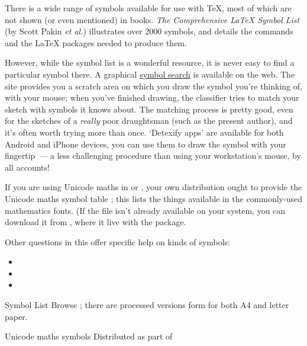 
There is a wide range of symbols available for use with \TeX{}, most
of which are not shown (or even mentioned) in \AllTeX{} books.
\emph{The Comprehensive \LaTeX{} Symbol List} (by Scott Pakin
\emph{et al.}\@) illustrates over 2000 symbols, and details the
commands and the \LaTeX{} packages needed to produce them.

However, while the symbol list is a wonderful resource, it is never
easy to find a particular symbol there.  A graphical %
\href{http://detexify.kirelabs.org/classify.html}{symbol search} is
available on the web.  The site provides you a scratch area on which
you draw the symbol you're thinking of, with your mouse; when you've
finished drawing, the classifier tries to match your sketch with
symbols it knows about.  The matching process is pretty good, even for
the sketches of a \emph{really} poor draughtsman (such as the present
author), and it's often worth trying more than once.  `Detexify apps'
are available for both Android and iPhone devices, you can use them to
draw the symbol with your fingertip~--- a less challenging procedure
than using your workstation's mouse, by all accounts!

If you are using Unicode maths in \xetex{} or \luatex{}, your own
distribution ought to provide the Unicode maths symbol table
; this lists the things available in the
commonly-used mathematics fonts.  (If the file isn't already available
on your system, you can download it from , where it live
with the  package.

Other questions in this  offer specific help on kinds of
symbols:
\begin{itemize}
\item {}
\item {}
\item {}
\end{itemize}
\begin{ctanrefs}
\item[\nothtml{\rmfamily}Symbol List]Browse ; there
  are processed versions  form for both A4 and letter paper.
\item[\nothtml{\rmfamily}Unicode maths symbols]Distributed as part of
\end{ctanrefs}

